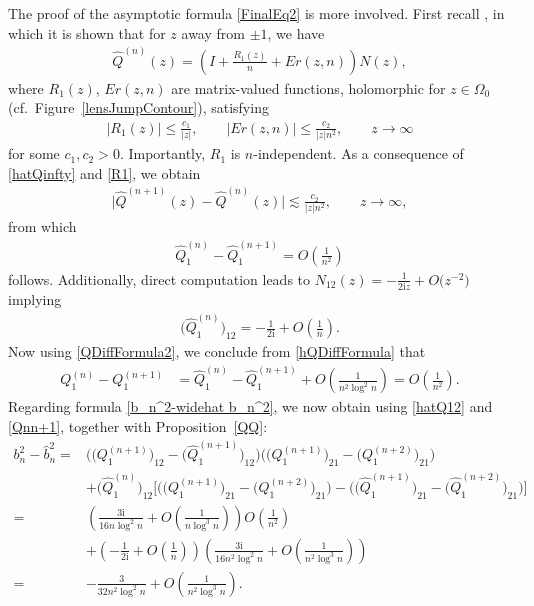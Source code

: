 \documentclass[11pt]{article}
\numberwithin{equation}{section}
\newcommand{\Id}{I}
\newcommand{\bQ}{ Q}
\newcommand{\hQ}{{\widehat Q}}
\newcommand{\I}{\mathrm{i}}
\numberwithin{equation}{section}
\begin{document}
The proof of the asymptotic formula \eqref{FinalEq2} is more involved. First recall \cite[Section~8]{KMVV}, in which it is shown that for $z$ away from $\pm 1$, we have
\begin{align} \label{hatQinfty}
 \hQ^{(n)}(z) = \left(\Id + \frac{R_1(z)}{n} + Er(z,n)\right)N(z),
\end{align}
where $R_1(z)$, $Er(z,n)$ are matrix-valued functions, holomorphic for $z \in \Omega_0$ (cf.\ Figure~\ref{lensJumpContour}), satisfying
\begin{align}\label{R1}
 |R_1(z)| \leq \frac{c_1}{|z|}, \qquad |Er(z,n)| \leq \frac{c_2}{|z|n^2}, \qquad z \to \infty
\end{align}
for some $c_1, c_2 > 0$. Importantly, $R_1$ is $n$-independent. As a consequence of \eqref{hatQinfty} and \eqref{R1}, we obtain
\begin{align*}
 \big|\hQ^{(n+1)}(z) - \hQ^{(n)}(z)\big| \lesssim \frac{c_2}{|z|n^2}, \qquad z\to \infty,
\end{align*}
from which
\begin{align}\label{hQDiffFormula}
 \hQ^{(n)}_1 - \hQ^{(n+1)}_1 = O\left(\frac{1}{n^2}\right)
\end{align}
follows. Additionally, direct computation leads to $N_{12}(z) = -\frac{1}{2\I z} + O\big(z^{-2}\big)$ implying
\begin{align}\label{hatQ12}
 \big(\hQ^{(n)}_1\big)_{12} = -\frac{1}{2\I} + O\left(\frac{1}{n}\right).
\end{align}
Now using \eqref{QDiffFormula2}, we conclude from \eqref{hQDiffFormula} that
\begin{align}
 \bQ^{(n)}_1 - \bQ^{(n+1)}_1 &= \hQ^{(n)}_1 - \hQ^{(n+1)}_1 + O\left(\frac{1}{n^2\log^2 n}\right)= O\left(\frac{1}{n^2}\right).\label{Qnn+1}
\end{align}
Regarding formula \eqref{b_n^2-widehat b_n^2}, we now obtain using \eqref{hatQ12} and \eqref{Qnn+1}, together with Proposition~\ref{QQ}:
\begin{align}\nonumber
 b_n^2-\widehat b_n^2={}& \big(\big(\bQ_1^{(n+1)}\big)_{12}-\big(\hQ_1^{(n+1)}\big)_{12}\big)\big(\big(\bQ_1^{(n+1)}\big)_{21}-\big(\bQ_1^{(n+2)}\big)_{21}\big)
 \\\nonumber
 &+ \big( \hQ_1^{(n)}\big)_{12}\big[\big(\big(\bQ_1^{(n+1)}\big)_{21}-\big(\bQ_1^{(n+2)}\big)_{21}\big)-\big(\big(\hQ_1^{(n+1)}\big)_{21}-\big(\hQ_1^{(n+2)}\big)_{21}\big)\big]\nonumber
 \\
={}& \left(\frac{3\I}{16n\log^2 n} + O\left(\frac{1}{n\log^3 n}\right)\right)O\left(\frac{1}{n^2}\right)\nonumber
 \\
 &+\left(-\frac{1}{2\I}+O\left(\frac{1}{n}\right)\right) \left(\frac{3\I}{16n^2\log^2 n} + O\left(\frac{1}{n^2\log^3 n}\right)\right)\nonumber
 \\
={}& -\frac{3}{32n^2\log^2 n} + O\left(\frac{1}{n^2\log^3 n}\right).\label{bnlong}
\end{align}
\end{document}
